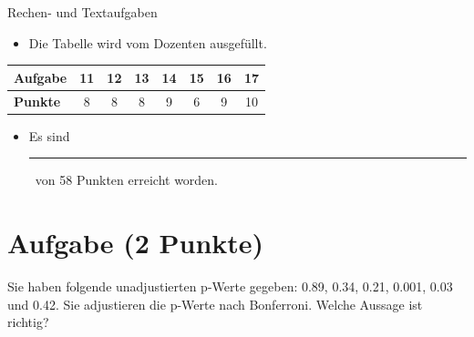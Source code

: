 \documentclass[a4paper, 10pt]{scrartcl}\usepackage[]{graphicx}\usepackage[]{xcolor}
\begin{document}
\begin{graybox}{Rechen- und Textaufgaben}
  \begin{itemize}
  \item Die Tabelle wird vom Dozenten ausgefüllt.
  \end{itemize}
  \begin{center}
    \large
    \begin{tabular}{|l|c|c|c|c|c|c|c|}
      \hline
      \textbf{Aufgabe} & 11 & 12 & 13 & 14 & 15 & 16 & 17 \strut\\
      \hline
      \textbf{Punkte} & 
      \hspace{1Ex}\Large\textcolor{gray!70}{8}\hspace{1Ex}  & 
      \hspace{1Ex}\Large\textcolor{gray!70}{8}\hspace{1Ex}  & 
      \hspace{1Ex}\Large\textcolor{gray!70}{8}\hspace{1Ex}  & 
      \hspace{1Ex}\Large\textcolor{gray!70}{9}\hspace{1Ex}  & 
      \hspace{1Ex}\Large\textcolor{gray!70}{6}\hspace{1Ex}  & 
      \hspace{1Ex}\Large\textcolor{gray!70}{9}\hspace{1Ex}  & 
      \hspace{1Ex}\Large\textcolor{gray!70}{10}\hspace{1Ex} \strut\\
      \hline
  \end{tabular}
\end{center}
\begin{itemize}
\item Es sind \rule[0ex]{2em}{.4pt}\, von 58 Punkten erreicht worden.
\end{itemize}
\end{graybox}

\clearpage

\section{Aufgabe \hfill (2 Punkte)}



Sie haben folgende unadjustierten p-Werte gegeben: 0.89, 0.34, 0.21, 0.001, 0.03 und 0.42. Sie adjustieren die p-Werte nach
Bonferroni. Welche Aussage ist richtig?
\end{document}
